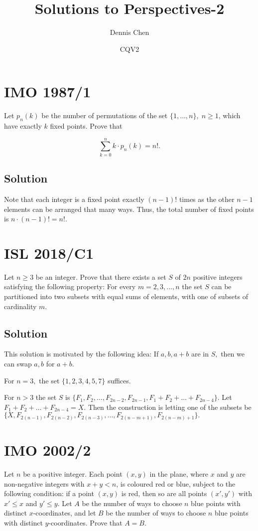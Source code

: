 \documentclass[mast]{lucky}
\title{Solutions to Perspectives-2}
\author{Dennis Chen}
\date{CQV2}
\begin{document}
\maketitle

\toc

\pagebreak\section{IMO 1987/1}

Let $p_n (k)$ be the number of permutations of the set $\{ 1, \ldots , n \} , \; n \ge 1$, which have exactly $k$ fixed points. Prove that

\[\sum_{k=0}^{n} k \cdot p_n (k) = n!.\]

\subsection{Solution}

Note that each integer is a fixed point exactly $(n-1)!$ times as the other $n-1$ elements can be arranged that many ways. Thus, the total number of fixed points is $n\cdot (n-1)!=n!.$

\pagebreak\section{ISL 2018/C1}
Let $n\geq 3$ be an integer. Prove that there exists a set $S$ of $2n$ positive integers satisfying the following property: For every $m=2,3,...,n$ the set $S$ can be partitioned into two subsets with equal sums of elements, with one of subsets of cardinality $m.$

\subsection{Solution}
This solution is motivated by the following idea: If $a,b,a+b$ are in $S,$ then we can swap $a,b$ for $a+b$.

For $n=3,$ the set $\{1,2,3,4,5,7\}$ suffices.

For $n>3$ the set $S$ is $\{F_1,F_2,\ldots,F_{2n-2},F_{2n-1},F_{1}+F_{2}+\ldots+F_{2n-4}\}.$ Let $F_1+F_2+\ldots+F_{2n-4}=X.$ Then the construction is letting one of the subsets be $\{X,F_{2(n-1)},F_{2(n-2)},F_{2(n-3)},\ldots,F_{2(n-m+1)},F_{2(n-m)+1}\}.$

\pagebreak\section{IMO 2002/2}
Let $n$ be a positive integer. Each point $(x,y)$ in the plane, where $x$ and $y$ are non-negative integers with $x+y<n$, is coloured red or blue, subject to the following condition: if a point $(x,y)$ is red, then so are all points $(x',y')$ with $x'\leq x$ and $y'\leq y$. Let $A$ be the number of ways to choose $n$ blue points with distinct $x$-coordinates, and let $B$ be the number of ways to choose $n$ blue points with distinct $y$-coordinates. Prove that $A=B$.
\end{document}
